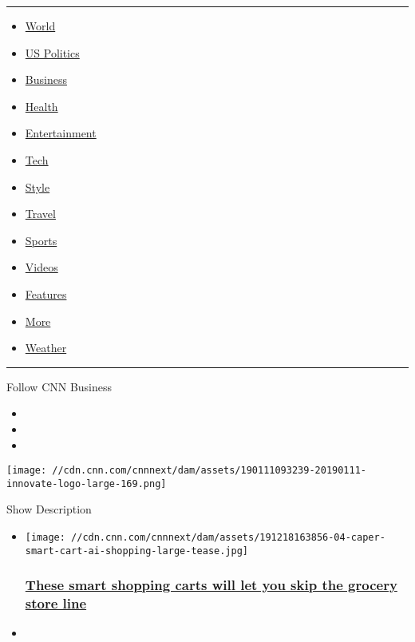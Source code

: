 \begin{center}\rule{0.5\linewidth}{\linethickness}\end{center}

\begin{itemize}
\tightlist
\item
  \href{/world}{World}
\item
  \href{/politics}{US Politics}
\item
  \href{/business}{Business}
\item
  \href{/health}{Health}
\item
  \href{/entertainment}{Entertainment}
\item
  \href{/business/tech}{Tech}
\item
  \href{/style}{Style}
\item
  \href{/travel}{Travel}
\item
  \href{/sport}{Sports}
\item
  \href{/videos}{Videos}
\item
  \href{/specials}{Features}
\item
  \href{/more}{More}
\item
  \href{/weather}{Weather}
\end{itemize}

\begin{center}\rule{0.5\linewidth}{\linethickness}\end{center}

Follow CNN Business

\begin{itemize}
\item
\item
\item
\end{itemize}

\texttt{[image: //cdn.cnn.com/cnnnext/dam/assets/190111093239-20190111-innovate-logo-large-169.png]}

Show Description

\begin{itemize}
\item
  \href{/2019/12/23/tech/smart-shopping-cart/index.html}{}

  \texttt{[image: //cdn.cnn.com/cnnnext/dam/assets/191218163856-04-caper-smart-cart-ai-shopping-large-tease.jpg]}

  \hypertarget{these-smart-shopping-carts-will-let-you-skip-the-grocery-store-line-}{%
  \subsubsection{\texorpdfstring{\href{/2019/12/23/tech/smart-shopping-cart/index.html}{These
  smart shopping carts will let you skip the grocery store line
  }}{These smart shopping carts will let you skip the grocery store line }}\label{these-smart-shopping-carts-will-let-you-skip-the-grocery-store-line-}}
\item
\end{itemize}

